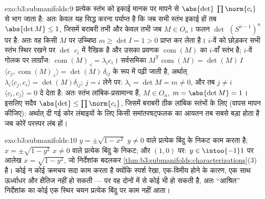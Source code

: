 \begin{solution}{exo:b3:submanifolds:9}
प्रत्येक स्तंभ को इकाई मानक पर मापने से $\abs{\det}$ $\prod\norm{c_i}$ से भाग जाता है:
अतः केवल यह सिद्ध करना पर्याप्त है कि जब सभी स्तंभ इकाई हों तब $\abs{\det M} \leq 1$,
जिसमें बराबरी तभी और केवल तभी जब $M \in O_n$। फलन $\det$  $(S^{n-1})^n$ पर 
है: अतः वह किसी $M$ पर उच्चिष्ठ $m \geq \det I = 1 > 0$ प्राप्त कर लेता है। $i$-वें
को छोड़कर सभी स्तंभ स्थिर रखने पर $\det$ $c_i$ में रैखिक है और उसका
प्रवणक $\operatorname{com}(M)$ का $i$-वाँ स्तंभ है; $i$-वें गोलक पर लाग्राँज: $\operatorname{com}(M)_{\cdot i} = \lambda_i c_i$।
सर्वसमिका $M^{\mathsf T}\operatorname{com}(M) = \det(M)\,I$ $\langle c_j, \operatorname{com}(M)_{\cdot i}\rangle =
\det(M)\,\delta_{ij}$ के रूप में पढ़ी जाती है, अर्थात् $\lambda_i\langle c_j,
c_i\rangle = \det(M)\delta_{ij}$; $j = i$
लेने पर: $\lambda_i
= \det M = m \neq 0$, और तब $j \neq i$ $\langle c_i,
c_j\rangle = 0$ दे देता है: अतः स्तंभ लांबिक-प्रसामान्य
हैं, $M \in O_n$, $m = \abs{\det M} = 1$। इसलिए सदैव $\abs{\det} \leq
\prod\norm{c_i}$, जिसमें बराबरी ठीक लांबिक स्तंभों
के लिए (वापस मापन कीजिए): अर्थात् दी गई कोर लंबाइयों के लिए किसी
समांतरषट्फलक का आयतन तब सबसे बड़ा होता है जब कोरें परस्पर लंब हों।
\end{solution}

\begin{solution}{exo:b3:submanifolds:10}
$y = \pm\sqrt{1 - x^2}$ $y \neq
0$ वाले प्रत्येक बिंदु के निकट काम करता है; $x = \pm\sqrt{1 - y^2}$ $x \neq 0$ वाले
प्रत्येक बिंदु के निकट; और $(1, 0)$ पर: $y \in
\intoo{-1}1$ पर आलेख $x = \sqrt{1 - y^2}$, जो निर्देशांक
बदलकर \cref{thm:b3:submanifolds:characterizations}(3) है। कोई न कोई क्रमचय सदा काम करता है क्योंकि स्पर्श
रेखा, एक-विमीय होने के कारण, एक साथ ऊर्ध्वाधर और क्षैतिज नहीं हो
सकती --- पर वह दोनों में से कोई भी हो सकती है, अतः ``आश्रित''
निर्देशांक का कोई एक स्थिर चयन प्रत्येक बिंदु पर काम नहीं आता।
\end{solution}

